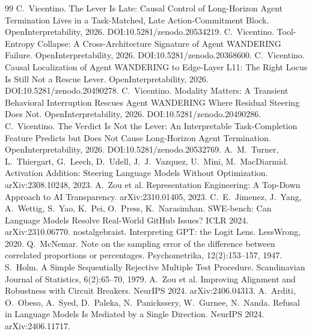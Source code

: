 \documentclass[11pt]{article}
\begin{document}
\begin{thebibliography}{99}
 C.~Vicentino. The Lever Is Late: Causal Control of Long-Horizon Agent Termination Lives in a Task-Matched, Late Action-Commitment Block. OpenInterpretability, 2026. DOI:10.5281/zenodo.20534219.
 C.~Vicentino. Tool-Entropy Collapse: A Cross-Architecture Signature of Agent WANDERING Failure. OpenInterpretability, 2026. DOI:10.5281/zenodo.20368600.
 C.~Vicentino. Causal Localization of Agent WANDERING to Edge-Layer L11: The Right Locus Is Still Not a Rescue Lever. OpenInterpretability, 2026. DOI:10.5281/zenodo.20490278.
 C.~Vicentino. Modality Matters: A Transient Behavioral Interruption Rescues Agent WANDERING Where Residual Steering Does Not. OpenInterpretability, 2026. DOI:10.5281/zenodo.20490286.
 C.~Vicentino. The Verdict Is Not the Lever: An Interpretable Task-Completion Feature Predicts but Does Not Cause Long-Horizon Agent Termination. OpenInterpretability, 2026. DOI:10.5281/zenodo.20532769.
 A.~M.~Turner, L.~Thiergart, G.~Leech, D.~Udell, J.~J.~Vazquez, U.~Mini, M.~MacDiarmid. Activation Addition: Steering Language Models Without Optimization. arXiv:2308.10248, 2023.
 A.~Zou et al. Representation Engineering: A Top-Down Approach to AI Transparency. arXiv:2310.01405, 2023.
 C.~E.~Jimenez, J.~Yang, A.~Wettig, S.~Yao, K.~Pei, O.~Press, K.~Narasimhan. SWE-bench: Can Language Models Resolve Real-World GitHub Issues? ICLR 2024. arXiv:2310.06770.
 nostalgebraist. Interpreting GPT: the Logit Lens. LessWrong, 2020.
 Q.~McNemar. Note on the sampling error of the difference between correlated proportions or percentages. Psychometrika, 12(2):153--157, 1947.
 S.~Holm. A Simple Sequentially Rejective Multiple Test Procedure. Scandinavian Journal of Statistics, 6(2):65--70, 1979.
 A.~Zou et al. Improving Alignment and Robustness with Circuit Breakers. NeurIPS 2024. arXiv:2406.04313.
 A.~Arditi, O.~Obeso, A.~Syed, D.~Paleka, N.~Panickssery, W.~Gurnee, N.~Nanda. Refusal in Language Models Is Mediated by a Single Direction. NeurIPS 2024. arXiv:2406.11717.
\end{thebibliography}
\end{document}

